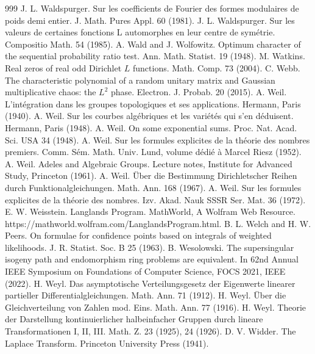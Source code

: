 \begin{thebibliography}{999}
 J. L. Waldspurger. Sur les coefficients de Fourier des formes modulaires de poids demi entier. J. Math. Pures Appl. 60 (1981).
 J. L. Waldspurger. Sur les valeurs de certaines fonctions L automorphes en leur centre de sym\'etrie. Compositio Math. 54 (1985).
 A. Wald and J. Wolfowitz. Optimum character of the sequential probability ratio test. Ann. Math. Statist. 19 (1948).
 M. Watkins. Real zeros of real odd Dirichlet $L$ functions. Math. Comp. 73 (2004).
 C. Webb. The characteristic polynomial of a random unitary matrix and Gaussian multiplicative chaos: the $L^2$ phase. Electron. J. Probab. 20 (2015).
 A. Weil. L'int\'egration dans les groupes topologiques et ses applications. Hermann, Paris (1940).
 A. Weil. Sur les courbes alg\'ebriques et les vari\'et\'es qui s'en d\'eduisent. Hermann, Paris (1948).
 A. Weil. On some exponential sums. Proc. Nat. Acad. Sci. USA 34 (1948).
 A. Weil. Sur les formules explicites de la th\'eorie des nombres premiers. Comm. S\'em. Math. Univ. Lund, volume d\'edi\'e \`a Marcel Riesz (1952).
 A. Weil. Adeles and Algebraic Groups. Lecture notes, Institute for Advanced Study, Princeton (1961).
 A. Weil. \"Uber die Bestimmung Dirichletscher Reihen durch Funktionalgleichungen. Math. Ann. 168 (1967).
 A. Weil. Sur les formules explicites de la th\'eorie des nombres. Izv. Akad. Nauk SSSR Ser. Mat. 36 (1972).
 E. W. Weisstein. Langlands Program. MathWorld, A Wolfram Web Resource. https://mathworld.wolfram.com/LanglandsProgram.html.
 B. L. Welch and H. W. Peers. On formulae for confidence points based on integrals of weighted likelihoods. J. R. Statist. Soc. B 25 (1963).
 B. Wesolowski. The supersingular isogeny path and endomorphism ring problems are equivalent. In 62nd Annual IEEE Symposium on Foundations of Computer Science, FOCS 2021, IEEE (2022).
 H. Weyl. Das asymptotische Verteilungsgesetz der Eigenwerte linearer partieller Differentialgleichungen. Math. Ann. 71 (1912).
 H. Weyl. \"Uber die Gleichverteilung von Zahlen mod. Eins. Math. Ann. 77 (1916).
 H. Weyl. Theorie der Darstellung kontinuierlicher halbeinfacher Gruppen durch lineare Transformationen I, II, III. Math. Z. 23 (1925), 24 (1926).
 D. V. Widder. The Laplace Transform. Princeton University Press (1941).

\end{thebibliography}
